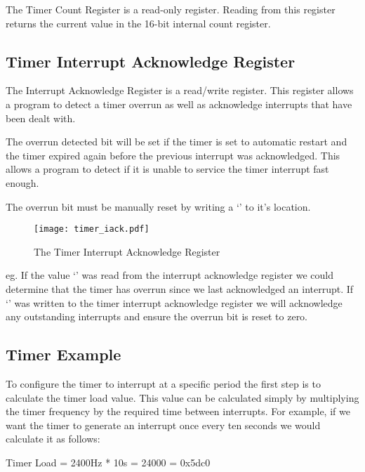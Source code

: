 The Timer Count Register is a read-only register. Reading from this
register returns the current value in the 16-bit internal count
register.

\subsection{Timer Interrupt Acknowledge Register}

The Interrupt Acknowledge Register is a read/write register. This
register allows a program to detect a timer overrun as well as
acknowledge interrupts that have been dealt with.

The overrun detected bit will be set if the timer is set to automatic
restart and the timer expired again before the previous interrupt was
acknowledged. This allows a program to detect if it is unable to
service the timer interrupt fast enough.

The overrun bit must be manually reset by writing a `' to
it's location.

\begin{figure}[h]
\begin{center}
\texttt{[image: timer\_iack.pdf]}
\caption{The Timer Interrupt Acknowledge Register}
\label{timer_iack_pic}
\end{center}
\end{figure}

eg. If the value `' was read from the interrupt acknowledge
register we could determine that the timer has overrun since we last
acknowledged an interrupt. If `' was written to the timer
interrupt acknowledge register we will acknowledge any outstanding
interrupts and ensure the overrun bit is reset to zero.

\subsection{Timer Example}

To configure the timer to interrupt at a specific period the first
step is to calculate the timer load value. This value can be
calculated simply by multiplying the timer frequency by the required
time between interrupts. For example, if we want the timer to generate
an interrupt once every ten seconds we would calculate it as follows:

\begin{center}
Timer Load = 2400Hz * 10s = 24000 = 0x5dc0
\end{center}

